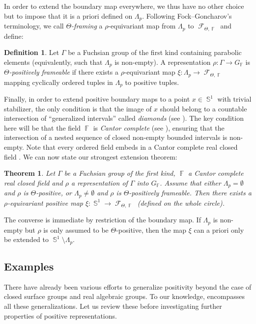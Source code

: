 \documentclass{amsart}
\theoremstyle{plain}
\newtheorem{ThmIntro}{Theorem}
\theoremstyle{definition}
\newtheorem{definition}[proposition]{Definition}
\DeclareMathOperator{\Fc}{\mathcal{F}}
\DeclareMathOperator{\Fb}{{\mathbb{F}}}
\DeclareMathOperator{\Sb}{\mathbb{S}}
\newcommand*\from{\colon}
\newcommand{\1}{\mathbf{1}}
\begin{document}
In order to extend the boundary map everywhere, we thus have no other choice but to impose that it is a priori defined on $\Lambda_p$. Following Fock--Goncharov's terminology, we call \emph{$\Theta$-framing} a $\rho$-equivariant map from $\Lambda_p$ to $\Fc_{\Theta,\Fb}$ and define:

\begin{definition}
   Let $\Gamma$ be a Fuchsian group of the first kind containing parabolic elements (equivalently, such that $\Lambda_p$ is non-empty). A representation $\rho \from \Gamma \to G_{\Fb}$ is \emph{$\Theta$-positively frameable} if there exists a $\rho$-equivariant map $\xi \from \Lambda_p \to \Fc_{\Theta, \Fb}$ mapping cyclically ordered tuples in $\Lambda_p$ to positive tuples.
\end{definition}


Finally, in order to extend positive boundary maps to a point $x\in \Sb^1$ with trivial stabilizer, the only condition is that the image of $x$ should belong to a countable intersection of ``generalized intervals'' called \emph{diamonds} (see ). The key condition here will be that the field $\Fb$ is \emph{Cantor complete} (see ), ensuring that the intersection of a nested sequence of closed non-empty bounded intervals is non-empty. Note that every ordered field embeds in a Cantor complete real closed field \cite{Shelah_QuiteCompleteRealClosedFields}. We can now state our strongest extension theorem: 
\begin{ThmIntro} \label{thm-intro: extension boundary map}
    Let $\Gamma$ be a Fuchsian group of the first kind, $\Fb$ a Cantor complete real closed field and $\rho$ a representation of $\Gamma$ into $G_{\Fb}$. Assume that either $\Lambda_p = \emptyset$ and $\rho$ is $\Theta$-positive, or $\Lambda_p\neq \emptyset$ and $\rho$ is $\Theta$-positively frameable. Then there exists a $\rho$-equivariant positive map $\xi \colon \Sb^1\to \Fc_{\Theta, \Fb}$ (defined on the whole circle).
\end{ThmIntro}

The converse is immediate by restriction of the boundary map. If $\Lambda_p$ is non-empty but $\rho$ is only assumed to be $\Theta$-positive, then the map $\xi$ can a priori only be extended to $\Sb^1 \setminus \Lambda_p$.

\subsection{Examples}
There have already been various efforts to generalize positivity beyond the case of closed surface groups and real algebraic groups. To our knowledge,  encompasses all these generalizations. Let us review these before investigating further properties of positive representations.
\end{document}
